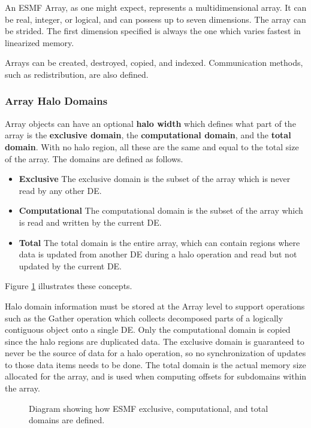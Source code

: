 

An ESMF Array, as one might expect, represents a multidimensional array.
It can be real, integer, or logical, and can possess up to seven 
dimensions.  The array can be strided.  The first dimension specified 
is always the one which varies fastest in linearized memory. 

Arrays can be created, destroyed, copied, and indexed.  Communication
methods, such as redistribution, are also defined.

\subsubsection{Array Halo Domains}

Array objects can have an optional {\bf halo width} which defines
what part of the array is the {\bf exclusive domain}, the {\bf computational
domain}, and the {\bf total domain}.  With no halo region, all these are
the same and equal to the total size of the array.  The domains are
defined as follows.

\begin{itemize}

\item {\bf Exclusive}  The exclusive domain is the subset of the
array which is never read by any other DE.  

\item {\bf Computational}  The computational domain
is the subset of the array which is read and written by the current DE.

\item {\bf Total}  The total domain is the entire array, which can 
contain regions where data is updated from another DE during a 
halo operation and read but not updated by the current DE.  

\end{itemize}

Figure \ref{fig:halo} illustrates these concepts.

Halo domain information must be stored at the Array level to
support operations such as the Gather operation which collects
decomposed parts of a logically contiguous object onto a single DE.
Only the computational domain is copied since the halo regions are
duplicated data.  The exclusive domain is guaranteed to never be
the source of data for a halo operation, so no synchronization
of updates to those data items needs to be done.  The total
domain is the actual memory size allocated for the array,
and is used when computing offsets for subdomains within the array.

\begin{center}
\begin{figure}
\caption{Diagram showing how ESMF exclusive, computational,
and total domains are defined.  }
\label{fig:halo}
\end{figure}
\end{center}

